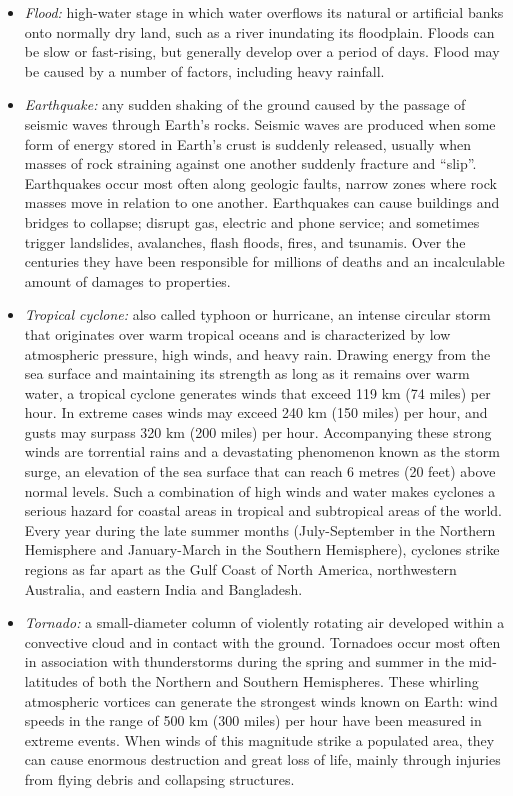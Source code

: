 \begin{itemize}
	\item \textit{Flood:} high-water stage in which water overflows its natural or artificial banks onto normally dry land, such as a river inundating its floodplain. Floods can be slow or fast-rising, but generally develop over a period of days. Flood may be caused by a number of factors, including heavy rainfall.
	\item \textit{Earthquake:} any sudden shaking of the ground caused by the passage of seismic waves through Earth's rocks. Seismic waves are produced when some form of energy stored in Earth's crust is suddenly released, usually when masses of rock straining against one another suddenly fracture and ``slip''. Earthquakes occur most often along geologic faults, narrow zones where rock masses move in relation to one another. Earthquakes can cause buildings and bridges to collapse; disrupt gas, electric and phone service; and sometimes trigger landslides, avalanches, flash floods, fires, and tsunamis. Over the centuries they have been responsible for millions of deaths and an incalculable amount of damages to properties.
	\item \textit{Tropical cyclone:} also called typhoon or hurricane, an intense circular storm that originates over warm tropical oceans and is characterized by low atmospheric pressure, high winds, and heavy rain. Drawing energy from the sea surface and maintaining its strength as long as it remains over warm water, a tropical cyclone generates winds that exceed 119 km (74 miles) per hour. In extreme cases winds may exceed 240 km (150 miles) per hour, and gusts may surpass 320 km (200 miles) per hour. Accompanying these strong winds are torrential rains and a devastating phenomenon known as the storm surge, an elevation of the sea surface that can reach 6 metres (20 feet) above normal levels. Such a combination of high winds and water makes cyclones a serious hazard for coastal areas in tropical and subtropical areas of the world. Every year during the late summer months (July-September in the Northern Hemisphere and January-March in the Southern Hemisphere), cyclones strike regions as far apart as the Gulf Coast of North America, northwestern Australia, and eastern India and Bangladesh.
	\item \textit{Tornado:} a small-diameter column of violently rotating air developed within a convective cloud and in contact with the ground. Tornadoes occur most often in association with thunderstorms during the spring and summer in the mid-latitudes of both the Northern and Southern Hemispheres. These whirling atmospheric vortices can generate the strongest winds known on Earth: wind speeds in the range of 500 km (300 miles) per hour have been measured in extreme events. When winds of this magnitude strike a populated area, they can cause enormous destruction and great loss of life, mainly through injuries from flying debris and collapsing structures.

\end{itemize}
